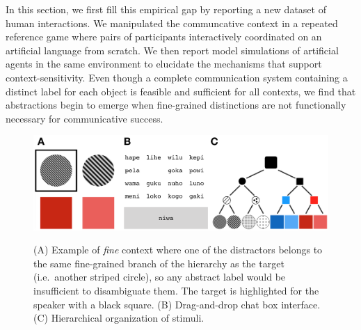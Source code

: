 In this section, we first fill this empirical gap by reporting a new dataset of human interactions.
We manipulated the communcative context in a repeated reference game where pairs of participants interactively coordinated on an artificial language from scratch. %
We then report model simulations of artificial agents in the same environment to elucidate the mechanisms that support context-sensitivity.
Even though a complete communication system containing a distinct label for each object is feasible and sufficient for all contexts, we find that abstractions begin to emerge when fine-grained distinctions are not functionally necessary for communicative success. 

\begin{figure}[t]
\begin{center}
{\includegraphics[scale=.55]{./figures/Sec2-design.png}}
{\caption{{(A) Example of \emph{fine} context where one of the distractors belongs to the same fine-grained branch of the hierarchy as the target (i.e.\ another striped circle), so any abstract label would be insufficient to disambiguate them. The target is highlighted for the speaker with a black square. (B) Drag-and-drop chat box interface. (C) Hierarchical organization of stimuli.\label{fig:context_design}}}}
\vspace{-2ex}
\end{center}
\end{figure}

